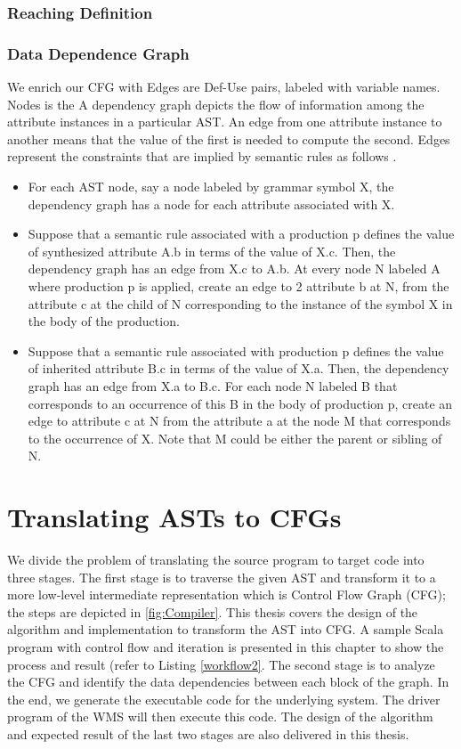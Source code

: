 \subsubsection{Reaching Definition}

\subsubsection{Data Dependence Graph}
We enrich our CFG with Edges are Def-Use pairs, labeled with variable names. Nodes is the 
A dependency graph depicts the flow of information among the attribute instances in a particular AST. An edge from one attribute instance to another means that the value of the first is needed to compute the second. Edges represent the constraints that are implied by semantic rules as follows \cite{lam2006compilers}.
\begin{itemize}
\item For each AST node, say a node labeled by grammar symbol X, the dependency graph has a node for each attribute associated with X.
\item Suppose that a semantic rule associated with a production p defines the value of synthesized attribute A.b in terms of the value of X.c. Then, the dependency graph has an edge from X.c to A.b. At every node N labeled A where production p is applied, create an edge to 2
attribute b at N, from the attribute c at the child of N corresponding to the instance of the symbol X in the body of the production.
\item Suppose that a semantic rule associated with production p defines the value of inherited attribute B.c in terms of the value of X.a. Then, the dependency graph has an edge from X.a to B.c. For each node N labeled B that corresponds to an occurrence of this B in the body of production p, create an edge to attribute c at N from the attribute a at the node M that corresponds to the occurrence of X. Note that M could be either the parent or sibling of N.
\end{itemize}

\section{Translating ASTs to CFGs}
We divide the problem of translating the source program to target code into three stages. The first stage is to traverse the given AST and transform it to a more low-level intermediate representation which is Control Flow Graph (CFG); the steps are depicted in \autoref{fig:Compiler}. This thesis covers the design of the algorithm and implementation to transform the AST into CFG. A sample Scala program with control flow and iteration is presented in this chapter to show the process and result (refer to Listing \ref{workflow2}. The second stage is to analyze the CFG and identify the data dependencies between each block of the graph. In the end, we generate the executable code for the underlying system. The driver program of the WMS will then execute this code. The design of the algorithm and expected result of the last two stages are also delivered in this thesis. 


